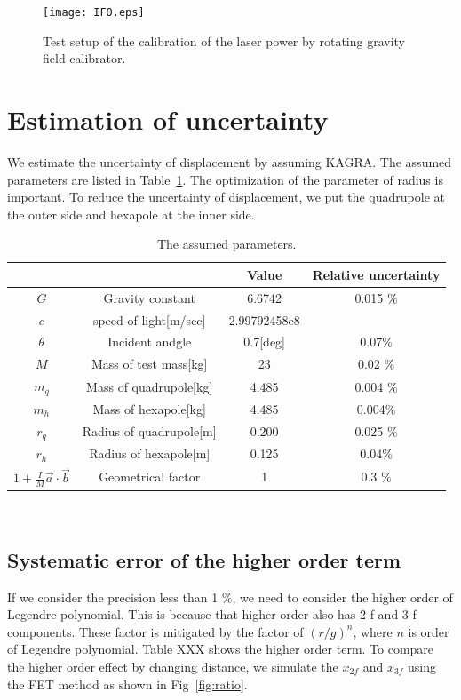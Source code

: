 \documentclass[A4]{spie}  %
\begin{document}
\begin{figure}
\begin{center}
\texttt{[image: IFO.eps]}
\caption{Test setup of the calibration of the laser power by rotating gravity field calibrator.}
\label{fig:IFO}
\end{center}
\end{figure}

\section{Estimation of uncertainty}
We estimate the uncertainty of displacement by assuming KAGRA. The assumed parameters are listed in Table~\ref{sus}. The optimization of the parameter of radius is important. To reduce the uncertainty of displacement, we put the quadrupole at the outer side and hexapole at the inner side.
\begin{table}
\begin{center}
\caption{\label{sus}The assumed parameters.}
\footnotesize
\begin{tabular}{cccc}
\hline
&&Value&Relative uncertainty \\
\hline
$G$& Gravity constant&6.6742&0.015 \%\\
$c$& speed of light[m/sec]&2.99792458e8&\\
$\theta$& Incident andgle&0.7[deg]& 0.07\%\\
$M$& Mass of test mass[kg]&23 & 0.02 \%\\
$m_q$&Mass of quadrupole[kg]&4.485 & 0.004 \%\\
$m_h$&Mass of hexapole[kg]& 4.485 &0.004\%\\
$r_q$&Radius of quadrupole[m]&0.200 & 0.025 \%\\
$r_h$&Radius of hexapole[m]& 0.125 & 0.04\%\\
$1+\frac{I}{M}\vec{a}\cdot \vec{b}$& Geometrical factor & 1&0.3 \% \\
\hline
\end{tabular}\\
\end{center}
\end{table}

\subsection{Systematic error of the higher order term}
If we consider the precision less than 1 \%, we need to consider the higher order of Legendre polynomial. This is because that higher order also has 2-f and 3-f components. These factor is mitigated by the factor of $(r/g)^n$, where $n$ is order of Legendre polynomial. Table XXX shows the higher order term. To compare the higher order effect by changing distance, we simulate the $x_{2f}$ and $x_{3f}$ using the FET method as shown in Fig~\ref{fig:ratio}. 
\end{document}
